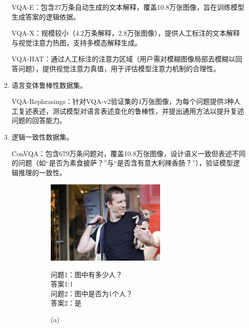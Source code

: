 \begin{enumerate}[nosep]
​VQA-E\cite{li2018vqa}：包含27万条自动生成的文本解释，覆盖10.8万张图像，旨在训练模型生成答案的逻辑依据。

​VQA-X\cite{park2018multimodal}：规模较小（4.2万条解释，2.8万张图像），提供人工标注的文本解释与视觉注意力热图，支持多模态解释生成。

​VQA-HAT\cite{das2017human}：通过人工标注的注意力区域（用户需对模糊图像局部去模糊以回答问题），提供视觉注意力真值，用于评估模型注意力机制的合理性。
    \item 语言变体鲁棒性数据集。

​VQA-Rephrasings\cite{shah2019cycle}：针对VQA-v2验证集的4万张图像，为每个问题提供3种人工复述表述，测试模型对语言表述变化的鲁棒性，并提出通用方法以提升复述问题的回答能力。
    \item 逻辑一致性数据集。

​ConVQA\cite{ray2018make}：包含679万条问题对，覆盖10.8万张图像，设计语义一致但表述不同的问题（如“是否为素食披萨？”与“是否含有意大利辣香肠？”），验证模型逻辑推理的一致性。
\begin{figure}[h]
    \begin{subfigure}[b]{0.45\textwidth}
        \centering
        \includegraphics[width=0.7\textwidth, keepaspectratio]{figures/CONVQA-A.png}
        \begin{center}
            \footnotesize 问题1：图中有多少人？\\
            \footnotesize 答案1:1\\
            \footnotesize 问题2：图中是否为1个人？\\
            \footnotesize 答案2：是\\
        \end{center}
        \caption*{(a)}
    \end{subfigure}
    \hfill
    \begin{subfigure}[b]{0.45\textwidth}
        \centering

\end{subfigure}
\end{figure}
\end{enumerate}
